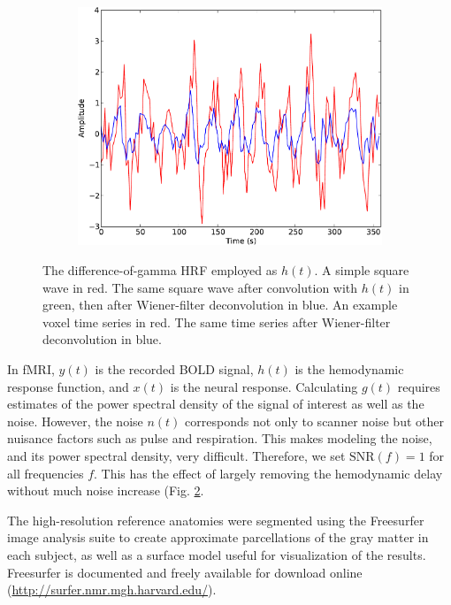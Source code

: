 \documentclass{article}
\begin{document}
\begin{figure}
\begin{subfigure}{0.3\textwidth}
\includegraphics[width=\textwidth]{figures/voxel-wiener-deconvolution}
\caption{}
\label{fig:wiener-voxel}
\end{subfigure}
\caption{
 The difference-of-gamma HRF employed as $h(t)$. 
 A simple square wave in red. 
The same square wave after convolution with $h(t)$ in green, then after Wiener-filter deconvolution in blue. 
 An example voxel time series in red. 
The same time series after Wiener-filter deconvolution in blue.}
\label{fig:wiener-deconvolution}
\end{figure}

In fMRI, $y(t)$ is the recorded BOLD signal, $h(t)$ is the hemodynamic response function, and $x(t)$ is the neural response.
Calculating $g(t)$ requires estimates of the power spectral density of the signal of interest as well as the noise.
However, the noise $n(t)$ corresponds not only to scanner noise but other nuisance factors such as pulse and respiration.
This makes modeling the noise, and its power spectral density, very difficult.
Therefore, we set $\mbox{SNR}(f) = 1$ for all frequencies $f$. 
This has the effect of largely removing the hemodynamic delay without much noise increase (Fig. \ref{fig:wiener-deconvolution}.

The high-resolution reference anatomies were segmented using the Freesurfer image analysis suite to create approximate parcellations of the gray matter in each subject, as well as a surface model useful for visualization of the results.
Freesurfer is documented and freely available for download online (\url{http://surfer.nmr.mgh.harvard.edu/}).
\end{document}
